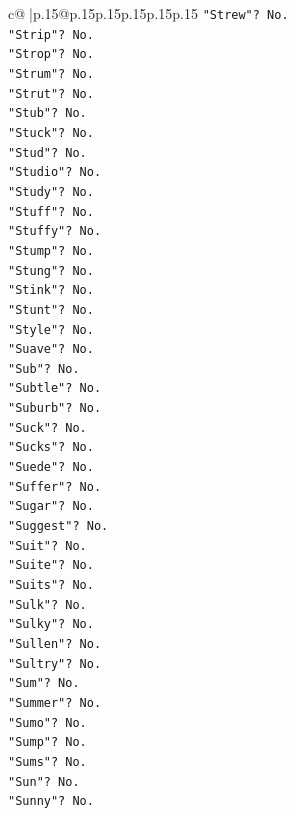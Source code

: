 \documentclass{article}
\begin{document}
{\begin{supertabular}{c@{$\;$}|p{.15\linewidth}@{}p{.15\linewidth}p{.15\linewidth}p{.15\linewidth}p{.15\linewidth}p{.15\linewidth}}
{{{\texttt{"Strew"? No.} \\
\texttt{"Strip"? No.} \\
\texttt{"Strop"? No.} \\
\texttt{"Strum"? No.} \\
\texttt{"Strut"? No.} \\
\texttt{"Stub"? No.} \\
\texttt{"Stuck"? No.} \\
\texttt{"Stud"? No.} \\
\texttt{"Studio"? No.} \\
\texttt{"Study"? No.} \\
\texttt{"Stuff"? No.} \\
\texttt{"Stuffy"? No.} \\
\texttt{"Stump"? No.} \\
\texttt{"Stung"? No.} \\
\texttt{"Stink"? No.} \\
\texttt{"Stunt"? No.} \\
\texttt{"Style"? No.} \\
\texttt{"Suave"? No.} \\
\texttt{"Sub"? No.} \\
\texttt{"Subtle"? No.} \\
\texttt{"Suburb"? No.} \\
\texttt{"Suck"? No.} \\
\texttt{"Sucks"? No.} \\
\texttt{"Suede"? No.} \\
\texttt{"Suffer"? No.} \\
\texttt{"Sugar"? No.} \\
\texttt{"Suggest"? No.} \\
\texttt{"Suit"? No.} \\
\texttt{"Suite"? No.} \\
\texttt{"Suits"? No.} \\
\texttt{"Sulk"? No.} \\
\texttt{"Sulky"? No.} \\
\texttt{"Sullen"? No.} \\
\texttt{"Sultry"? No.} \\
\texttt{"Sum"? No.} \\
\texttt{"Summer"? No.} \\
\texttt{"Sumo"? No.} \\
\texttt{"Sump"? No.} \\
\texttt{"Sums"? No.} \\
\texttt{"Sun"? No.} \\
\texttt{"Sunny"? No.} \\
}}}
\end{supertabular}}
\end{document}
